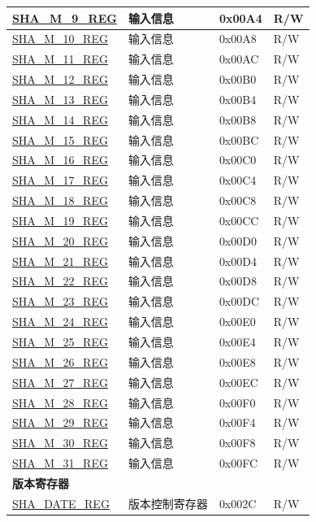 \begin{longtable}{ | l| p{7.5cm} | p{1.3cm} | p{1cm} | }
\hyperref[regdesc:SHAMNREG]{SHA\_M\_9\_REG} & 输入信息 & 0x00A4 & R/W \\ \hline
\hyperref[regdesc:SHAMNREG]{SHA\_M\_10\_REG} & 输入信息 & 0x00A8 & R/W \\ \hline
\hyperref[regdesc:SHAMNREG]{SHA\_M\_11\_REG} & 输入信息 & 0x00AC & R/W \\ \hline
\hyperref[regdesc:SHAMNREG]{SHA\_M\_12\_REG} & 输入信息 & 0x00B0 & R/W \\ \hline
\hyperref[regdesc:SHAMNREG]{SHA\_M\_13\_REG} & 输入信息 & 0x00B4 & R/W \\ \hline
\hyperref[regdesc:SHAMNREG]{SHA\_M\_14\_REG} & 输入信息 & 0x00B8 & R/W \\ \hline
\hyperref[regdesc:SHAMNREG]{SHA\_M\_15\_REG} & 输入信息 & 0x00BC & R/W \\ \hline
\hyperref[regdesc:SHAMNREG]{SHA\_M\_16\_REG} & 输入信息 & 0x00C0 & R/W \\ \hline
\hyperref[regdesc:SHAMNREG]{SHA\_M\_17\_REG} & 输入信息 & 0x00C4 & R/W \\ \hline
\hyperref[regdesc:SHAMNREG]{SHA\_M\_18\_REG} & 输入信息 & 0x00C8 & R/W \\ \hline
\hyperref[regdesc:SHAMNREG]{SHA\_M\_19\_REG} & 输入信息 & 0x00CC & R/W \\ \hline
\hyperref[regdesc:SHAMNREG]{SHA\_M\_20\_REG} & 输入信息 & 0x00D0 & R/W \\ \hline
\hyperref[regdesc:SHAMNREG]{SHA\_M\_21\_REG} & 输入信息 & 0x00D4 & R/W \\ \hline
\hyperref[regdesc:SHAMNREG]{SHA\_M\_22\_REG} & 输入信息 & 0x00D8 & R/W \\ \hline
\hyperref[regdesc:SHAMNREG]{SHA\_M\_23\_REG} & 输入信息 & 0x00DC & R/W \\ \hline
\hyperref[regdesc:SHAMNREG]{SHA\_M\_24\_REG} & 输入信息 & 0x00E0 & R/W \\ \hline
\hyperref[regdesc:SHAMNREG]{SHA\_M\_25\_REG} & 输入信息 & 0x00E4 & R/W \\ \hline
\hyperref[regdesc:SHAMNREG]{SHA\_M\_26\_REG} & 输入信息 & 0x00E8 & R/W \\ \hline
\hyperref[regdesc:SHAMNREG]{SHA\_M\_27\_REG} & 输入信息 & 0x00EC & R/W \\ \hline
\hyperref[regdesc:SHAMNREG]{SHA\_M\_28\_REG} & 输入信息 & 0x00F0 & R/W \\ \hline
\hyperref[regdesc:SHAMNREG]{SHA\_M\_29\_REG} & 输入信息 & 0x00F4 & R/W \\ \hline
\hyperref[regdesc:SHAMNREG]{SHA\_M\_30\_REG} & 输入信息 & 0x00F8 & R/W \\ \hline
\hyperref[regdesc:SHAMNREG]{SHA\_M\_31\_REG} & 输入信息 & 0x00FC & R/W \\ \hline
\multicolumn{4}{|l|}{\textbf{版本寄存器}} \\ \hline
\hyperref[regdesc:SHADATEREG]{SHA\_DATE\_REG} & 版本控制寄存器 & 0x002C & R/W \\ \hline
\end{longtable}

